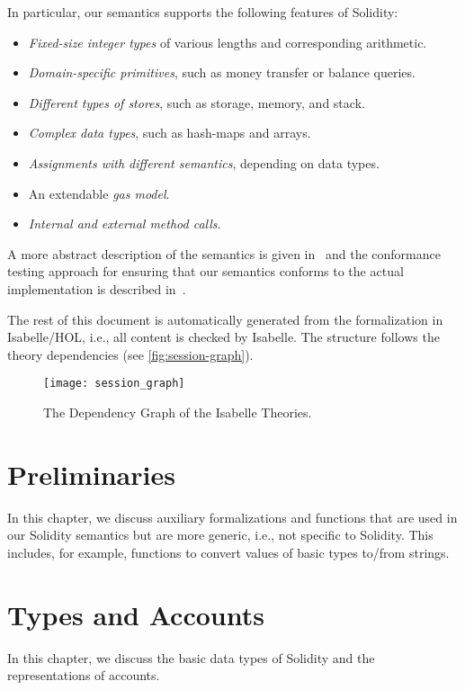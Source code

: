 \documentclass[10pt,DIV17,a4paper,abstract=true,twoside=semi,openright]
{scrreprt}
\begin{document}
In particular, our semantics supports the following features of Solidity:
\begin{itemize}
	\item \emph{Fixed-size integer types} of various lengths and corresponding arithmetic.
	\item \emph{Domain-specific primitives}, such as money transfer or balance queries.
	\item \emph{Different types of stores}, such as storage, memory, and stack.
	\item \emph{Complex data types}, such as hash-maps and arrays.
	\item \emph{Assignments with different semantics}, depending on data types.
	\item An extendable \emph{gas model}.
	\item \emph{Internal and external method calls}.
\end{itemize}

A more abstract description of the semantics is given
in~\cite{marmsoler.ea:solidity-semantics:2021} and the conformance testing
approach for ensuring that our semantics conforms to the actual 
implementation is described in~\cite{marmsoler.ea:conformance:2022}.


The rest of this document is automatically generated from the formalization in
Isabelle/HOL, i.e., all content is checked by Isabelle. The structure follows
the theory dependencies (see \autoref{fig:session-graph}).

\begin{figure}
  \centering
  \texttt{[image: session\_graph]}
  \caption{The Dependency Graph of the Isabelle Theories.\label{fig:session-graph}}
\end{figure}

\clearpage
%

\chapter{Preliminaries}
In this chapter, we discuss auxiliary formalizations and functions that
are used in our Solidity semantics but are more generic, i.e., not
specific to Solidity. This includes, for example, functions to convert
values of basic types to/from strings.






\chapter{Types and Accounts}
In this chapter, we discuss the basic data types of Solidity and the
representations of accounts. 
\end{document}
